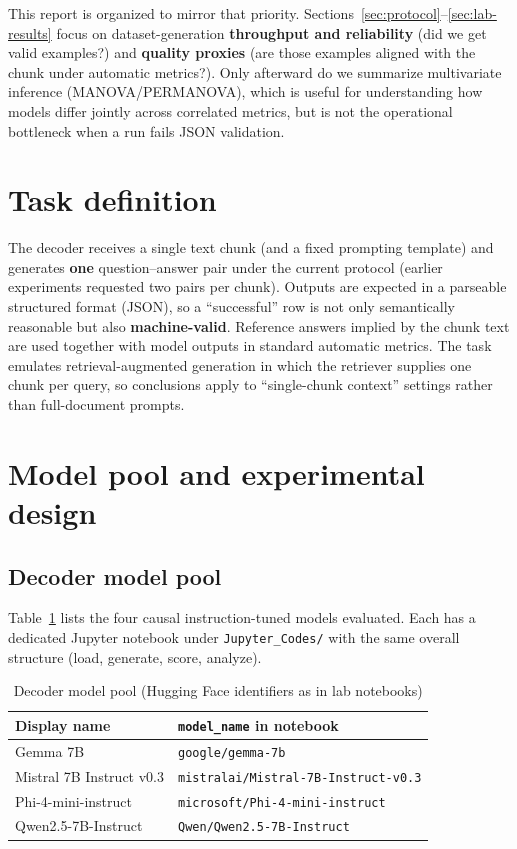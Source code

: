 \documentclass[11pt]{article}
\begin{document}
This report is organized to mirror that priority. Sections~\ref{sec:protocol}--\ref{sec:lab-results} focus on dataset-generation \textbf{throughput and reliability} (did we get valid examples?) and \textbf{quality proxies} (are those examples aligned with the chunk under automatic metrics?). Only afterward do we summarize multivariate inference (MANOVA/PERMANOVA), which is useful for understanding how models differ jointly across correlated metrics, but is not the operational bottleneck when a run fails JSON validation.

\section{Task definition}
\label{sec:task}

The decoder receives a single text chunk (and a fixed prompting template) and generates \textbf{one} question--answer pair under the current protocol (earlier experiments requested two pairs per chunk). Outputs are expected in a parseable structured format (JSON), so a ``successful'' row is not only semantically reasonable but also \textbf{machine-valid}. Reference answers implied by the chunk text are used together with model outputs in standard automatic metrics. The task emulates retrieval-augmented generation in which the retriever supplies one chunk per query, so conclusions apply to ``single-chunk context'' settings rather than full-document prompts.

\section{Model pool and experimental design}

\subsection{Decoder model pool}

Table~\ref{tab:decoder-pool} lists the four causal instruction-tuned models evaluated. Each has a dedicated Jupyter notebook under \texttt{Jupyter\_Codes/} with the same overall structure (load, generate, score, analyze).

\begin{table}[H]
\centering
\caption{Decoder model pool (Hugging Face identifiers as in lab notebooks)}
\label{tab:decoder-pool}
\begin{tabular}{ll}
\toprule
Display name & \texttt{model\_name} in notebook \\
\midrule
Gemma 7B & \texttt{google/gemma-7b} \\
Mistral 7B Instruct v0.3 & \texttt{mistralai/Mistral-7B-Instruct-v0.3} \\
Phi-4-mini-instruct & \texttt{microsoft/Phi-4-mini-instruct} \\
Qwen2.5-7B-Instruct & \texttt{Qwen/Qwen2.5-7B-Instruct} \\
\bottomrule
\end{tabular}
\end{table}
\end{document}
